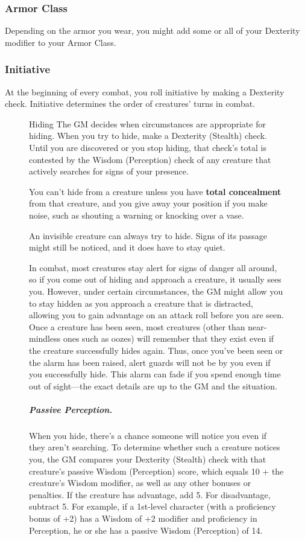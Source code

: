 \subsubsection{Armor Class}

Depending on the armor you wear, you might add some or all of your Dexterity modifier to your Armor Class.

\subsubsection{Initiative} \label{sec:initiative}

At the beginning of every combat, you roll initiative by making a Dexterity check. Initiative determines the order of creatures' turns in combat.

\begin{figure}[htb]
    \begin{DndSidebar}{Hiding}
The GM decides when circumstances are appropriate for hiding. When you try to hide, make a Dexterity (Stealth) check. Until you are discovered or you stop hiding, that check's total is contested by the Wisdom (Perception) check of any creature that actively searches for signs of your presence.

You can't hide from a creature unless you have \textbf{total concealment} from that creature, and you give away your position if you make noise, such as shouting a warning or knocking over a vase.

An invisible creature can always try to hide. Signs of its passage might still be noticed, and it does have to stay quiet.

In combat, most creatures stay alert for signs of danger all around, so if you come out of hiding and approach a creature, it usually sees you. However, under certain circumstances, the GM might allow you to stay hidden as you approach a creature that is distracted, allowing you to gain advantage on an attack roll before you are seen. Once a creature has been seen, most creatures (other than near-mindless ones such as oozes) will remember that they exist even if the creature successfully hides again. Thus, once you've been seen or the alarm has been raised, alert guards will not be  by you even if you successfully hide. This alarm can fade if you spend enough time out of sight---the exact details are up to the GM and the situation.

\subparagraph*{Passive Perception.} When you hide, there's a chance someone will notice you even if they aren't searching. To determine whether such a creature notices you, the GM compares your Dexterity (Stealth) check with that creature's passive Wisdom (Perception) score, which equals 10 + the creature's Wisdom modifier, as well as any other bonuses or penalties. If the creature has advantage, add 5. For disadvantage, subtract 5. For example, if a 1st-level character (with a proficiency bonus of +2) has a Wisdom of +2 modifier and proficiency in Perception, he or she has a passive Wisdom (Perception) of 14.


\end{DndSidebar}
\end{figure}
